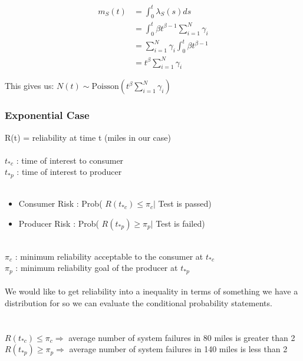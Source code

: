 \documentclass[12pt]{article}
\begin{document}
$$
\begin{aligned}
	m_S(t) &= \int_0^t \lambda_S(s)ds \\
    &= \int_0^t \beta t^{\beta -1} \sum_{i = 1}^N \gamma_i \\
    &= \sum_{i = 1}^N \gamma_i \int_0^t \beta t^{\beta -1} \\
    &= t^\beta \sum_{i = 1}^N \gamma_i
\end{aligned}
$$

This gives us: $N(t) \sim \text{Poisson}(t^\beta \sum_{i = 1}^N \gamma_i)$

\subsubsection{Exponential Case}

R(t) = reliability at time t (miles in our case)
\\
\\$ t_{*c} $ : time of interest to consumer
\\$ t_{*p} $ : time of interest to producer
\\
\\
\begin{itemize}
\item Consumer Risk :   Prob( $ R(t_{*c}) \leq \pi_c \vert $ Test is passed)
\item Producer Risk :   Prob( $ R(t_{*p}) \geq \pi_p \vert $ Test is failed)
\end{itemize}
\
\\$ \pi_c $ : minimum reliability acceptable to the consumer at $ t_{*c} $
\\$ \pi_p $ : minimum reliability goal of the producer at $ t_{*p} $
\\
\\
We would like to get reliability into a inequality in terms of something we have
a distribution for so we can evaluate the conditional probability statements.
\\
\\
\\$ R(t_{*c}) \leq \pi_c \Rightarrow $ average number of system failures in 80
miles is greater than 2
\\$ R(t_{*p}) \geq \pi_p \Rightarrow $ average number of system failures in 140
miles is less than 2
\end{document}
